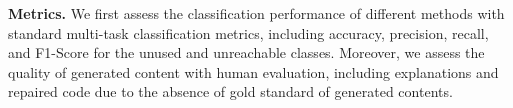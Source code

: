 \documentclass[11pt]{article}
\begin{document}






\label{metric}
\noindent \textbf{Metrics.} We first assess the classification performance of different methods with standard multi-task classification metrics, including accuracy, precision, recall, and F1-Score for the unused and unreachable classes.
Moreover, we assess the quality of generated content with human evaluation, including explanations and repaired code due to the absence of gold standard of generated contents.

\end{document}
